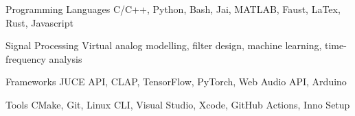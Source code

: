 

\begin{cvskills}

    \cvskill
    {Programming Languages} %
    {C/C++, Python, Bash, Jai, MATLAB, Faust, LaTex, Rust, Javascript} %

    \cvskill
    {Signal Processing} %
    {Virtual analog modelling, filter design, machine learning, time-frequency analysis} %

    \cvskill
    {Frameworks} %
    {JUCE API, CLAP, TensorFlow, PyTorch, Web Audio API, Arduino} %

    \cvskill
    {Tools} %
    {CMake, Git, Linux CLI, Visual Studio, Xcode, GitHub Actions, Inno Setup} %

\end{cvskills}
